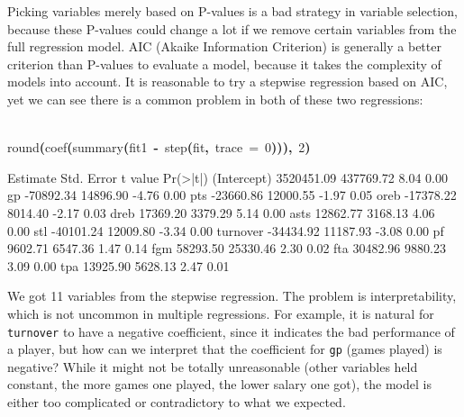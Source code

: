 \documentclass[english]{article}
\newenvironment{dummy}{\par}{\par}
\newcommand{\hlnumber}[1]{\textcolor[rgb]{0.0823529411764706,0.0784313725490196,0.709803921568627}{#1}}%
\newcommand{\hlfunctioncall}[1]{\textcolor[rgb]{1,0,0}{#1}}%
\newcommand{\hlkeyword}[1]{\textcolor[rgb]{0,0,0}{\textbf{#1}}}%
\newcommand{\hlargument}[1]{\textcolor[rgb]{0.694117647058824,0.247058823529412,0.0196078431372549}{#1}}%
\newcommand{\hlassignement}[1]{\textcolor[rgb]{0.215686274509804,0.215686274509804,0.384313725490196}{\textbf{#1}}}%
\newcommand{\hlsymbol}[1]{\textcolor[rgb]{0,0,0}{#1}}%
\newcommand{\hlprompt}[1]{\textcolor[rgb]{0,0,0}{#1}}%
\newcommand{\hlstd}[1]{\textcolor[rgb]{0,0,0}{#1}}%
\begin{document}
Picking variables merely based on P-values is a bad strategy in variable
selection, because these P-values could change a lot if we remove
certain variables from the full regression model. AIC (Akaike Information
Criterion) is generally a better criterion than P-values to evaluate
a model, because it takes the complexity of models into account. It
is reasonable to try a stepwise regression based on AIC, yet we can
see there is a common problem in both of these two regressions:
\begin{dummy}
\hspace*{\fill}\\
\hlstd{}\ttfamily\noindent
\hlprompt{\usebox{\hlnormalsizeboxgreaterthan}{\ }}\hlfunctioncall{round}\hlkeyword{(}\hlfunctioncall{coef}\hlkeyword{(}\hlfunctioncall{summary}\hlkeyword{(}\hlsymbol{fit1}{\ }\hlassignement{\usebox{\hlnormalsizeboxlessthan}-}{\ }\hlfunctioncall{step}\hlkeyword{(}\hlsymbol{fit}\hlkeyword{,}{\ }\hlargument{trace}{\ }\hlargument{=}{\ }\hlnumber{0}\hlkeyword{)}\hlkeyword{)}\hlkeyword{)}\hlkeyword{,}{\ }\hlnumber{2}\hlkeyword{)}\mbox{}
\normalfont
\hspace*{\fill}\\
\hlstd{}\begin{Schunk}
\begin{Soutput}
              Estimate Std. Error t value Pr(>|t|)
(Intercept) 3520451.09  437769.72    8.04     0.00
gp           -70892.34   14896.90   -4.76     0.00
pts          -23660.86   12000.55   -1.97     0.05
oreb         -17378.22    8014.40   -2.17     0.03
dreb          17369.20    3379.29    5.14     0.00
asts          12862.77    3168.13    4.06     0.00
stl          -40101.24   12009.80   -3.34     0.00
turnover     -34434.92   11187.93   -3.08     0.00
pf             9602.71    6547.36    1.47     0.14
fgm           58293.50   25330.46    2.30     0.02
fta           30482.96    9880.23    3.09     0.00
tpa           13925.90    5628.13    2.47     0.01
\end{Soutput}

\end{Schunk}
\end{dummy}
We got 11 variables from the stepwise regression. The problem is interpretability,
which is not uncommon in multiple regressions. For example, it is
natural for \texttt{turnover} to have a negative coefficient, since
it indicates the bad performance of a player, but how can we interpret
that the coefficient for \texttt{gp} (games played) is negative? While
it might not be totally unreasonable (other variables held constant,
the more games one played, the lower salary one got), the model is
either too complicated or contradictory to what we expected.
\end{document}

